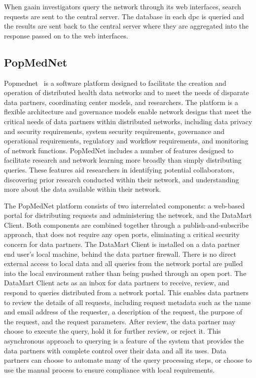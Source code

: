 When \gls{gaain} investigators query the network through its web interfaces, search requests are sent to the central server.
The database in each \gls{dpc} is queried and the results are sent back to the central server where they are aggregated into the response passed on to the web interfaces.

\subsection*{PopMedNet}
Popmednet~\cite{popmednet} is a software platform designed to facilitate the creation and operation of distributed health data networks and to meet the needs of disparate data partners, coordinating center models, and researchers.
The platform is a flexible architecture and governance models enable network designs that meet the critical needs of data partners within distributed networks, including data privacy and security requirements, system security requirements, governance and operational requirements, regulatory and workflow requirements, and monitoring of network functions.
PopMedNet includes a number of features designed to facilitate research and network learning more broadly than simply distributing queries.
These features aid researchers in identifying potential collaborators, discovering prior research conducted within their network, and understanding more about the data available within their network.

The PopMedNet platform consists of two interrelated components: a web-based portal for distributing requests and administering the network, and the DataMart Client.
Both components are combined together through a publish-and-subscribe approach, that does not require any open ports, eliminating a critical security concern for data partners.
The DataMart Client is installed on a data partner end user’s local machine, behind the data partner firewall.
There is no direct external access to local data and all queries from the network portal are pulled into the local environment rather than being pushed through an open port.
The DataMart Client acts as an inbox for data partners to receive, review, and respond to queries distributed from a network portal.
This enables data partners to review the details of all requests, including request metadata such as the name and email address of the requester, a description of the request, the purpose of the request, and the request parameters.
After review, the data partner may choose to execute the query, hold it for further review, or reject it.
This asynchronous approach to querying is a feature of the system that provides the data partners with complete control over their data and all its uses.
Data partners can choose to automate many of the query processing steps, or choose to use the manual process to ensure compliance with local requirements.

